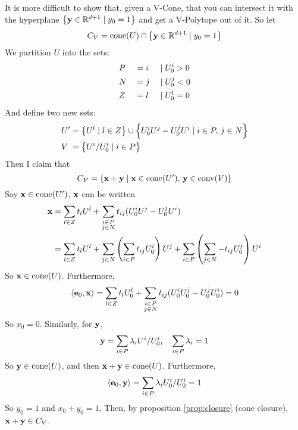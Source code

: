 It is more difficult to show that, given a V-Cone, that you can intersect it with the hyperplane $\left\{\mathbf{y} \in \mathbb{R}^{d+1} \;|\; y_0 = 1\right\}$ and get a V-Polytope out of it.  So let
\[ C_V = \operatorname{cone}(U) \cap \left\{\mathbf{y} \in \mathbb{R}^{d+1} \;|\; y_0 = 1\right\} \]
We partition $U$ into the sets:
\begin{alignat*}{3}
	 & P &  & = i & \;|\; & U^i_{0} > 0 \\
	 & N &  & = j & \;|\; & U^j_{0} < 0 \\
	 & Z &  & = l & \;|\; & U^l_{0} = 0
\end{alignat*}
And define two new sets:
\begin{align*}
	U'  & = \left\{U^l \;|\; l \in Z\right\} \cup \left\{U^i_{0} U^j - U^j_{0} U^i \;|\; i\in P,\, j\in N\right\} \\
	V\; & = \left\{U^i/U^i_{0} \;|\; i \in P\right\}
\end{align*}
Then I claim that
\begin{equation}\label{eq:cvtopv}
	C_V = \left\{\mathbf{x} + \mathbf{y} \;|\; \mathbf{x}\in\operatorname{cone}(U'),\, \mathbf{y}\in\operatorname{conv}(V)\right\}
\end{equation}
Say $\mathbf{x} \in\operatorname{cone}(U')$, $\mathbf{x}$ can be written
\begin{align*}
	\mathbf{x} & = \sum_{l\in Z}t_l U^l + \sum_{\substack{i\in P \\ j\in N}} t_{ij}(U^i_{0} U^j - U^j_{0} U^i)      \\
	   & = \sum_{l\in Z}t_l U^l + \sum_{j\in N} \left(\sum_{i\in P} t_{ij}U^i_{0}\right) U^j
	+ \sum_{i\in P} \left(\sum_{j\in N} -t_{ij}U^j_{0}\right) U^i
\end{align*}
So $\mathbf{x} \in \operatorname{cone}(U)$.  Furthermore,
\[ \left\langle \mathbf{e}_0, \mathbf{x} \right\rangle = \sum_{l\in Z}t_l U^l_{0} + \sum_{\substack{i\in P \\ j\in N}} t_{ij}(U^i_{0} U^j_{0} - U^j_{0} U^i_{0}) = 0\]
So $x_0 = 0$.  Similarly, for $\mathbf{y}$,
\[ \mathbf{y} = \sum_{i\in P} \lambda_i U^i/U^i_{0},\quad\sum_{i\in P}\lambda_i = 1 \]
So $\mathbf{y} \in \operatorname{cone}(U)$, and then $\mathbf{x} + \mathbf{y} \in \operatorname{cone}(U)$.  Furthermore,
\[ \left\langle \mathbf{e}_0, \mathbf{y} \right\rangle = \sum_{i\in P} \lambda_i U^i_{0}/U^i_{0} = 1\]
So $y_0 = 1$ and $x_0 + y_0 = 1$.  Then, by proposition \ref{prop:closure} (cone closure), $\mathbf{x} + \mathbf{y} \in C_V$.

